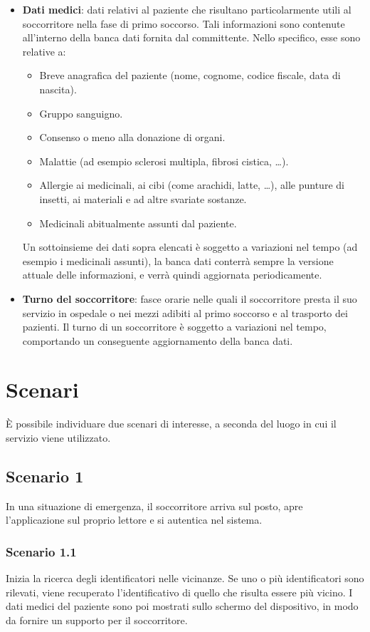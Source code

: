\documentclass[a4paper,12pt]{report}
\begin{document}
\begin{itemize}
	\item \textbf{Dati medici}: dati relativi al paziente che risultano particolarmente utili al soccorritore nella fase di primo soccorso. Tali informazioni sono contenute all'interno della banca dati fornita dal committente. Nello specifico, esse sono relative a:
	\begin{itemize}
		\item Breve anagrafica del paziente (nome, cognome, codice fiscale, data di nascita).
		\item Gruppo sanguigno.
		\item Consenso o meno alla donazione di organi.
		\item Malattie (ad esempio sclerosi multipla, fibrosi cistica, \dots).
		\item Allergie ai medicinali, ai cibi (come arachidi, latte, \dots), alle punture di insetti, ai materiali e ad altre svariate sostanze.
		\item Medicinali abitualmente assunti dal paziente.
	\end{itemize}
	Un sottoinsieme dei dati sopra elencati è soggetto a variazioni nel tempo (ad esempio i medicinali assunti), la banca dati conterrà sempre la versione attuale delle informazioni, e verrà quindi aggiornata periodicamente.  
	\item \textbf{Turno del soccorritore}: fasce orarie nelle quali il soccorritore presta il suo servizio in ospedale o nei mezzi adibiti al primo soccorso e al trasporto dei pazienti. Il turno di un soccorritore è soggetto a variazioni nel tempo, comportando un conseguente aggiornamento della banca dati.
\end{itemize}

\section{Scenari} \label{scenarios}
È possibile individuare due scenari di interesse, a seconda del luogo in cui il servizio viene utilizzato.
\subsection{Scenario 1} \label{scenario1}
In una situazione di emergenza, il soccorritore arriva sul posto, apre l'applicazione sul proprio lettore e si autentica nel sistema. 

\subsubsection*{Scenario 1.1}
Inizia la ricerca degli identificatori nelle vicinanze. Se uno o più identificatori sono rilevati, viene recuperato l'identificativo di quello che risulta essere più vicino. I dati medici del paziente sono poi mostrati sullo schermo del dispositivo, in modo da fornire un supporto per il soccorritore.
\end{document}
